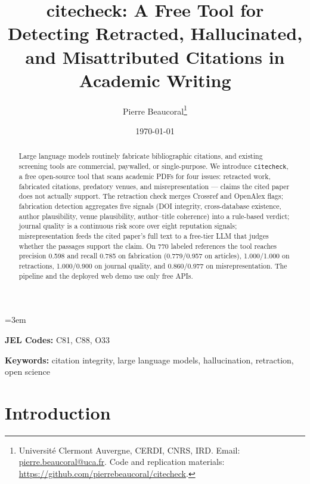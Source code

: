 \documentclass[12pt]{article}
\title{citecheck: A Free Tool for Detecting Retracted, Hallucinated, and Misattributed Citations in Academic Writing}
\author{
Pierre Beaucoral\thanks{Université Clermont Auvergne, CERDI, CNRS, IRD. Email: \href{mailto:pierre.beaucoral@uca.fr}{pierre.beaucoral@uca.fr}. Code and replication materials: \url{https://github.com/pierrebeaucoral/citecheck}.}
}
\date{\today}
\begin{document}
\emergencystretch=3em
\sloppy

\maketitle
\thispagestyle{empty}

\begin{abstract}
\noindent \singlespacing
Large language models routinely fabricate bibliographic citations, and existing screening tools are commercial, paywalled, or single-purpose. We introduce \texttt{citecheck}, a free open-source tool that scans academic PDFs for four issues: retracted work, fabricated citations, predatory venues, and misrepresentation --- claims the cited paper does not actually support. The retraction check merges Crossref and OpenAlex flags; fabrication detection aggregates five signals (DOI integrity, cross-database existence, author plausibility, venue plausibility, author--title coherence) into a rule-based verdict; journal quality is a continuous risk score over eight reputation signals; misrepresentation feeds the cited paper's full text to a free-tier LLM that judges whether the passages support the claim. On 770 labeled references the tool reaches precision 0.598 and recall 0.785 on fabrication (0.779/0.957 on articles), 1.000/1.000 on retractions, 1.000/0.900 on journal quality, and 0.860/0.977 on misrepresentation. The pipeline and the deployed web demo use only free APIs.
\end{abstract}

\vspace{1em}
\noindent \textbf{JEL Codes:} C81, C88, O33

\vspace{0.5em}
\noindent \textbf{Keywords:} citation integrity, large language models, hallucination, retraction, open science

\newpage
\setcounter{page}{1}


\section{Introduction}\label{sec:intro}
\end{document}
